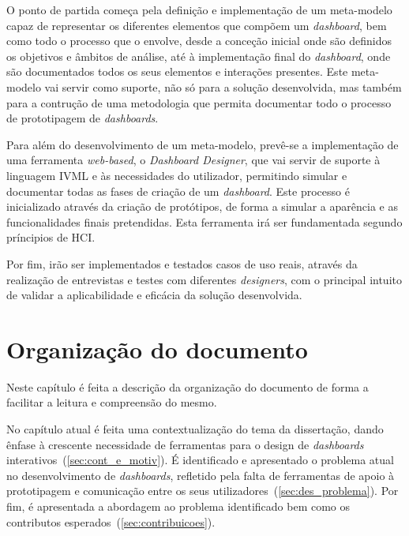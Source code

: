 O ponto de partida começa pela definição e implementação de um meta-modelo capaz de representar os diferentes elementos que compõem um \textit{dashboard}, bem como todo o processo que o envolve, desde a conceção inicial onde são definidos os objetivos e âmbitos de análise, até à implementação final do \textit{dashboard}, onde são documentados todos os seus elementos e interações presentes. Este meta-modelo vai servir como suporte, não só para a solução desenvolvida, mas também para a contrução de uma metodologia que permita documentar todo o processo de prototipagem de \textit{dashboards}.

Para além do desenvolvimento de um meta-modelo, prevê-se a implementação de uma ferramenta \textit{web-based}, o \textit{Dashboard Designer}, que vai servir de suporte à linguagem \gls{IVML} e às necessidades do utilizador, permitindo simular e documentar todas as fases de criação de um \textit{dashboard}. Este processo é inicializado através da criação de protótipos, de forma a simular a aparência e as funcionalidades finais pretendidas. Esta ferramenta irá ser fundamentada segundo príncipios de \gls{HCI}.

Por fim, irão ser implementados e testados casos de uso reais, através da realização de entrevistas e testes com diferentes \textit{designers}, com o principal intuito de validar a aplicabilidade e eficácia da solução desenvolvida. 

\section{Organização do documento}
\label{sec:organizacao}

Neste capítulo é feita a descrição da organização do documento de forma a facilitar a leitura e compreensão do mesmo. 

No capítulo atual é feita uma contextualização do tema da dissertação, dando ênfase à crescente necessidade de ferramentas para o design de \textit{dashboards} interativos~(\ref{sec:cont_e_motiv}). É identificado e apresentado o problema atual no desenvolvimento de \textit{dashboards}, refletido pela falta de ferramentas de apoio à prototipagem e comunicação entre os seus utilizadores~(\ref{sec:des_problema}). Por fim, é apresentada a abordagem ao problema identificado bem como os contributos esperados~(\ref{sec:contribuicoes}).

